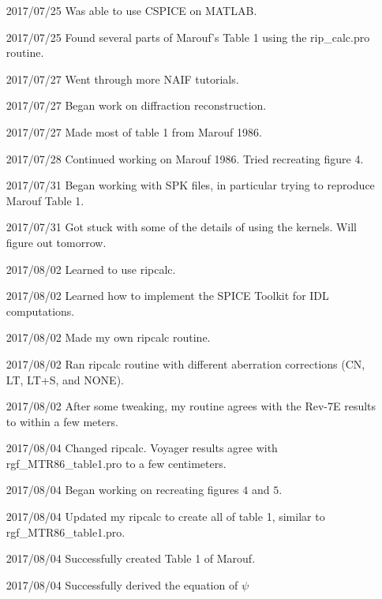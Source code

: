 \documentclass[crop=false,class=article,oneside]{standalone}
\begin{document}
\begin{enumerate}[leftmargin=55pt]
            \item[2017/07/25] Was able to use CSPICE on MATLAB.
            \item[2017/07/25] Found several parts of Marouf's Table 1
                              using the rip\_calc.pro routine.
            \item[2017/07/27] Went through more NAIF tutorials.
            \item[2017/07/27] Began work on diffraction reconstruction.
            \item[2017/07/27] Made most of table 1 from Marouf 1986.
            \item[2017/07/28] Continued working on Marouf 1986.
                              Tried recreating figure 4.
            \item[2017/07/31] Began working with SPK files,
                              in particular trying
                              to reproduce Marouf Table 1.
            \item[2017/07/31] Got stuck with some of the details of using the
                              kernels. Will figure out tomorrow.
            \item[2017/08/02] Learned to use ripcalc.
            \item[2017/08/02] Learned how to implement the SPICE Toolkit
                              for IDL computations.
            \item[2017/08/02] Made my own ripcalc routine.
            \item[2017/08/02] Ran ripcalc routine with different
                              aberration corrections (CN, LT, LT+S, and NONE).
            \item[2017/08/02] After some tweaking, my routine agrees with the
                              Rev-7E results to within a few meters.
            \item[2017/08/04] Changed ripcalc. Voyager results
                              agree with rgf\_MTR86\_table1.pro to a
                              few centimeters.
            \item[2017/08/04] Began working on recreating
                              figures $4$ and $5$.
            \item[2017/08/04] Updated my ripcalc to create all of table 1,
                              similar to rgf\_MTR86\_table1.pro.
            \item[2017/08/04] Successfully created Table 1 of Marouf. 
            \item[2017/08/04] Successfully derived the equation of $\psi$

\end{enumerate}
\end{document}
